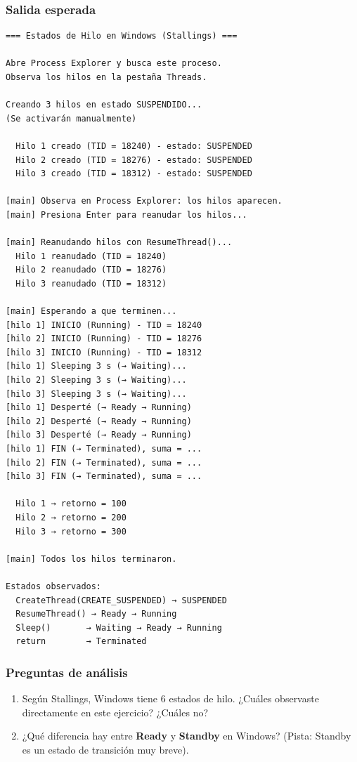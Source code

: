 \documentclass[
  spanish,
]{article}
\providecommand{\tightlist}{%
  \setlength{\itemsep}{0pt}\setlength{\parskip}{0pt}}
\begin{document}
\subsubsection{Salida esperada}\label{salida-esperada-4}

\begin{verbatim}
=== Estados de Hilo en Windows (Stallings) ===

Abre Process Explorer y busca este proceso.
Observa los hilos en la pestaña Threads.

Creando 3 hilos en estado SUSPENDIDO...
(Se activarán manualmente)

  Hilo 1 creado (TID = 18240) - estado: SUSPENDED
  Hilo 2 creado (TID = 18276) - estado: SUSPENDED
  Hilo 3 creado (TID = 18312) - estado: SUSPENDED

[main] Observa en Process Explorer: los hilos aparecen.
[main] Presiona Enter para reanudar los hilos...

[main] Reanudando hilos con ResumeThread()...
  Hilo 1 reanudado (TID = 18240)
  Hilo 2 reanudado (TID = 18276)
  Hilo 3 reanudado (TID = 18312)

[main] Esperando a que terminen...
[hilo 1] INICIO (Running) - TID = 18240
[hilo 2] INICIO (Running) - TID = 18276
[hilo 3] INICIO (Running) - TID = 18312
[hilo 1] Sleeping 3 s (→ Waiting)...
[hilo 2] Sleeping 3 s (→ Waiting)...
[hilo 3] Sleeping 3 s (→ Waiting)...
[hilo 1] Desperté (→ Ready → Running)
[hilo 2] Desperté (→ Ready → Running)
[hilo 3] Desperté (→ Ready → Running)
[hilo 1] FIN (→ Terminated), suma = ...
[hilo 2] FIN (→ Terminated), suma = ...
[hilo 3] FIN (→ Terminated), suma = ...

  Hilo 1 → retorno = 100
  Hilo 2 → retorno = 200
  Hilo 3 → retorno = 300

[main] Todos los hilos terminaron.

Estados observados:
  CreateThread(CREATE_SUSPENDED) → SUSPENDED
  ResumeThread() → Ready → Running
  Sleep()       → Waiting → Ready → Running
  return        → Terminated
\end{verbatim}

\subsubsection{Preguntas de análisis}\label{preguntas-de-anuxe1lisis-4}

\begin{enumerate}
\def\labelenumi{\arabic{enumi}.}
\tightlist
\item
  Según Stallings, Windows tiene 6 estados de hilo. ¿Cuáles observaste
  directamente en este ejercicio? ¿Cuáles no?
\item
  ¿Qué diferencia hay entre \textbf{Ready} y \textbf{Standby} en
  Windows? (Pista: Standby es un estado de transición muy breve).
\end{enumerate}
\end{document}
